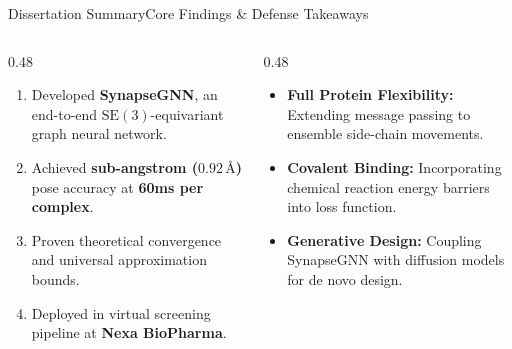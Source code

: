 \documentclass[10pt,aspectratio=169]{beamer}
\begin{document}
\begin{frame}{Dissertation Summary}{Core Findings \& Defense Takeaways}
  \begin{columns}[T]
    \begin{column}{0.48\textwidth}
      \begin{tcolorbox}[highlightbox,title={\faCheckSquare \quad Summary of Achievements}]
        \small
        \begin{enumerate}
          \setlength{\itemsep}{4pt}
          \item Developed \textbf{SynapseGNN}, an end-to-end $\mathrm{SE}(3)$-equivariant graph neural network.
          \item Achieved \textbf{sub-angstrom ($0.92\,\text{\AA}$)} pose accuracy at \textbf{60ms per complex}.
          \item Proven theoretical convergence and universal approximation bounds.
          \item Deployed in virtual screening pipeline at \textbf{Nexa BioPharma}.
        \end{enumerate}
      \end{tcolorbox}
    \end{column}
    
    \begin{column}{0.48\textwidth}
      \begin{tcolorbox}[defensebox,title={\faCompass \quad Future Research Directions}]
        \small
        \begin{itemize}
          \setlength{\itemsep}{4pt}
          \item \textbf{Full Protein Flexibility:} Extending message passing to ensemble side-chain movements.
          \item \textbf{Covalent Binding:} Incorporating chemical reaction energy barriers into loss function.
          \item \textbf{Generative Design:} Coupling SynapseGNN with diffusion models for de novo design.
        \end{itemize}
      \end{tcolorbox}
    \end{column}
  \end{columns}
\end{frame}
\end{document}
